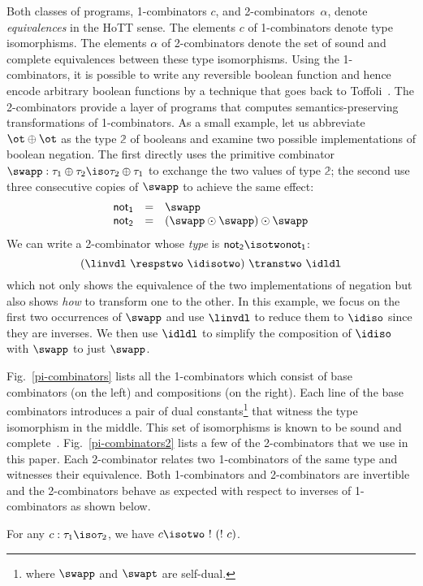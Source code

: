 \noindent Both classes of programs, 1-combinators $c$, and
2-combinators~$\alpha$, denote \emph{equivalences} in the HoTT sense. The
elements $c$ of 1-combinators denote type isomorphisms. The elements $\alpha$ of
2-combinators denote the set of sound and complete equivalences between these
type isomorphisms. Using the 1-combinators, it is possible to write any
reversible boolean function and hence encode arbitrary boolean functions by a
technique that goes back to Toffoli~\cite{Toffoli:1980}. The 2-combinators
provide a layer of programs that computes semantics-preserving transformations
of 1-combinators. As a small example, let us abbreviate $\ot \oplus \ot$ as the
type $\mathbb{2}$ of booleans and examine two possible implementations of
boolean negation. The first directly uses the primitive combinator
$\swapp : \tau_1 \oplus \tau_2 \iso \tau_2 \oplus \tau_1$ to exchange the two
values of type $\mathbb{2}$; the second use three consecutive copies of $\swapp$
to achieve the same effect:
\[\begin{array}{rcl}
\mathsf{not_1} &=& \swapp \\
\mathsf{not_2} &=& (\swapp \odot \swapp) \odot \swapp
\end{array}\]
We can write a 2-combinator whose \emph{type} is $\mathsf{not_2}
\isotwo \mathsf{not_1}$:
\[
(\linvdl ~\respstwo~ \idisotwo)~\transtwo~\idldl
\]
which not only shows the equivalence of the two implementations of negation but
also shows \emph{how} to transform one to the other. In this example, we focus
on the first two occurrences of $\swapp$ and use $\linvdl$ to reduce them to
$\idiso$ since they are inverses. We then use $\idldl$ to simplify the
composition of $\idiso$ with $\swapp$ to just $\swapp$.

Fig.~\ref{pi-combinators} lists all the 1-combinators which consist of
base combinators (on the left) and compositions (on the right). Each
line of the base combinators introduces a pair of dual
constants\footnote{where $\swapp$ and $\swapt$ are self-dual.} that
witness the type isomorphism in the middle. This set of isomorphisms
is known to be sound and
complete~\cite{Fiore:2004,fiore-remarks}. Fig.~\ref{pi-combinators2}
lists a few of the 2-combinators that we use in this paper. Each
2-combinator relates two 1-combinators of the same type and witnesses
their equivalence. Both 1-combinators and 2-combinators are invertible
and the 2-combinators behave as expected with respect to inverses of
1-combinators as shown below.

\begin{proposition}
For any $c : \tau_1 \iso \tau_2$, we have $c \isotwo ~!~(!~c)$.
\end{proposition}

